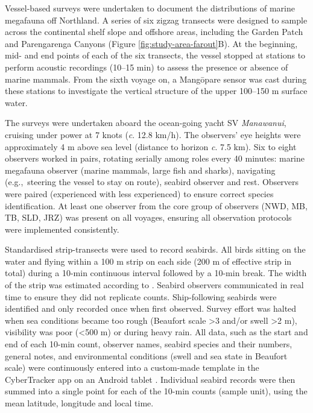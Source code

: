 \documentclass[preprint, 3p, authoryear]{elsarticle} %
\begin{document}
Vessel-based surveys were undertaken to document the distributions of marine megafauna off Northland. A series of six zigzag transects were designed to sample across the continental shelf slope and offshore areas, including the Garden Patch and Parengarenga Canyons (Figure \ref{fig:study-area-farout}B). At the beginning, mid- and end points of each of the six transects, the vessel stopped at stations to perform acoustic recordings (10--15 min) to assess the presence or absence of marine mammals. From the sixth voyage on, a Mang\={o}pare sensor \citep[temperature-depth recorder (TDR);][]{jakoboski2024} was cast during these stations to investigate the vertical structure of the upper 100--150 m surface water.

The surveys were undertaken aboard the ocean-going yacht SV \emph{Manawanui}, cruising under power at 7 knots (\emph{c}. 12.8 km/h). The observers' eye heights were approximately 4 m above sea level (distance to horizon \emph{c}. 7.5 km). Six to eight observers worked in pairs, rotating serially among roles every 40 minutes: marine megafauna observer (marine mammals, large fish and sharks), navigating (e.g.,~steering the vessel to stay on route), seabird observer and rest. Observers were paired (experienced with less experienced) to ensure correct species identification. At least one observer from the core group of observers (NWD, MB, TB, SLD, JRZ) was present on all voyages, ensuring all observation protocols were implemented consistently.

Standardised strip-transects \citep[][`Method 1a']{tasker1984} were used to record seabirds. All birds sitting on the water and flying within a 100 m strip on each side (200 m of effective strip in total) during a 10-min continuous interval followed by a 10-min break. The width of the strip was estimated according to \citet{heinemann1981}. Seabird observers communicated in real time to ensure they did not replicate counts. Ship-following seabirds were identified and only recorded once when first observed. Survey effort was halted when sea conditions became too rough (Beaufort scale \textgreater3 and/or swell \textgreater2 m), visibility was poor (\textless500 m) or during heavy rain. All data, such as the start and end of each 10-min count, observer names, seabird species and their numbers, general notes, and environmental conditions (swell and sea state in Beaufort scale) were continuously entered into a custom-made template in the CyberTracker app on an Android tablet \citep[e.g.,][]{bearzi2008}. Individual seabird records were then summed into a single point for each of the 10-min counts (sample unit), using the mean latitude, longitude and local time.
\end{document}
